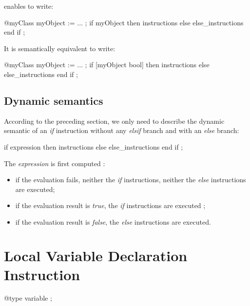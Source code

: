 enables to write:
{
\begin{galgascode}
@myClass myObject := ... ;
if myObject then
  instructions
else
  else_instructions
end if ;
\end{galgascode}
}

It is semantically equivalent to write:
{
\begin{galgascode}
@myClass myObject := ... ;
if [myObject bool] then
  instructions
else
  else_instructions
end if ;
\end{galgascode}
}


\subsection{Dynamic semantics}

According to the preceding section, we only need to describe the dynamic semantic of an \emph{if} instruction without any \emph{elsif} branch and with an \emph{else} branch:
{
\begin{galgascode}
if expression then
  instructions
else
  else_instructions
end if ;  
\end{galgascode}
}



The \emph{expression} is first computed :
\begin{itemize}
\item if the evaluation fails, neither the \emph{if} instructions, neither the \emph{else} instructions are executed;
\item if the evaluation result is \emph{true}, the \emph{if} instructions are executed ;
\item if the evaluation result is \emph{false}, the \emph{else} instructions are executed.
\end{itemize}



\section{Local Variable Declaration Instruction}


{
\begin{galgascode}
@type variable ;
\end{galgascode}
}

